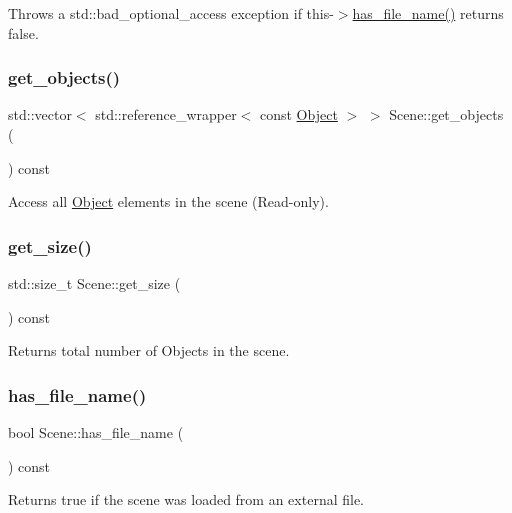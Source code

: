 Throws a std\+::bad\+\_\+optional\+\_\+access exception if this-\/$>$\mbox{\hyperlink{class_scene_a743728388c669fc24f8bd3630f785fbe}{has\+\_\+file\+\_\+name()}} returns false. \mbox{\label{class_scene_aeac49e2c0a9d551af5419e05f449842c}} 
\subsubsection{\texorpdfstring{get\+\_\+objects()}{get\_objects()}}
{\footnotesize\ttfamily std\+::vector$<$ std\+::reference\+\_\+wrapper$<$ const \mbox{\hyperlink{class_object}{Object}} $>$ $>$ Scene\+::get\+\_\+objects (\begin{DoxyParamCaption}{ }\end{DoxyParamCaption}) const}

Access all \mbox{\hyperlink{class_object}{Object}} elements in the scene (Read-\/only). \mbox{\label{class_scene_afb4f9eb929eef70ad8580a00797442a4}} 
\subsubsection{\texorpdfstring{get\+\_\+size()}{get\_size()}}
{\footnotesize\ttfamily std\+::size\+\_\+t Scene\+::get\+\_\+size (\begin{DoxyParamCaption}{ }\end{DoxyParamCaption}) const}

Returns total number of Objects in the scene. \mbox{\label{class_scene_a743728388c669fc24f8bd3630f785fbe}} 
\subsubsection{\texorpdfstring{has\+\_\+file\+\_\+name()}{has\_file\_name()}}
{\footnotesize\ttfamily bool Scene\+::has\+\_\+file\+\_\+name (\begin{DoxyParamCaption}{ }\end{DoxyParamCaption}) const}

Returns true if the scene was loaded from an external file. \mbox{\label{class_scene_ad73b372380c1dece59733bf31e38eb19}} 
